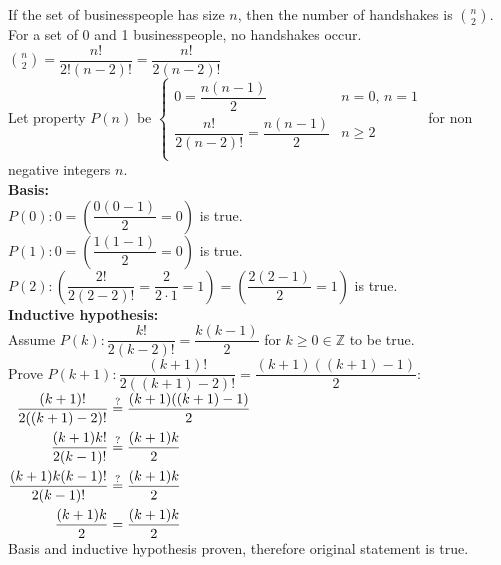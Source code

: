 \documentclass[letterpaper,fleqn,leqno]{article}
\begin{document}
\begin{enumerate}[(a)]
{			If the set of businesspeople has size $n$, then the number of handshakes is $\displaystyle \binom{n}{2}$. \\
			For a set of 0 and 1 businesspeople, no handshakes occur. \\
			$\displaystyle \binom{n}{2}=\dfrac{n!}{2!(n-2)!}=\dfrac{n!}{2(n-2)!}$ \\
			Let property $P(n)$ be $\begin{cases}
				0=\dfrac{n(n-1)}{2} & n=0,\, n=1 \\
				\dfrac{n!}{2(n-2)!}=\dfrac{n(n-1)}{2} & n\geq2 \\
			\end{cases}$ for non negative integers $n$. \\
			\textbf{Basis:} \\
			$P(0):0=\left(\dfrac{0(0-1)}{2}=0\right)$ is true. \\
			$P(1):0=\left(\dfrac{1(1-1)}{2}=0\right)$ is true. \\
			$P(2): \left(\dfrac{2!}{2(2-2)!}=\dfrac{2}{2\cdot1}=1\right)=\left(\dfrac{2(2-1)}{2}=1\right)$ is true. \\
			\textbf{Inductive hypothesis:} \\
			Assume $P(k): \dfrac{k!}{2(k-2)!}=\dfrac{k(k-1)}{2}$ for $k\geq0\in\mathbb{Z}$ to be true. \\
			Prove $P(k+1): \dfrac{(k+1)!}{2((k+1)-2)!}=\dfrac{(k+1)((k+1)-1)}{2}$: \\
			$\begin{aligned}[t]
				\dfrac{(k+1)!}{2((k+1)-2)!} &\stackrel{?}{=} \dfrac{(k+1)((k+1)-1)}{2} \\
				\dfrac{(k+1)k!}{2(k-1)!} &\stackrel{?}{=} \dfrac{(k+1)k}{2} \\
				\dfrac{(k+1)k(k-1)!}{2(k-1)!} &\stackrel{?}{=} \dfrac{(k+1)k}{2} \\
				\dfrac{(k+1)k}{2} &= \dfrac{(k+1)k}{2} \\
			\end{aligned}$ \\
			Basis and inductive hypothesis proven, therefore original statement is true. \\
		}
\end{enumerate}
\end{document}
